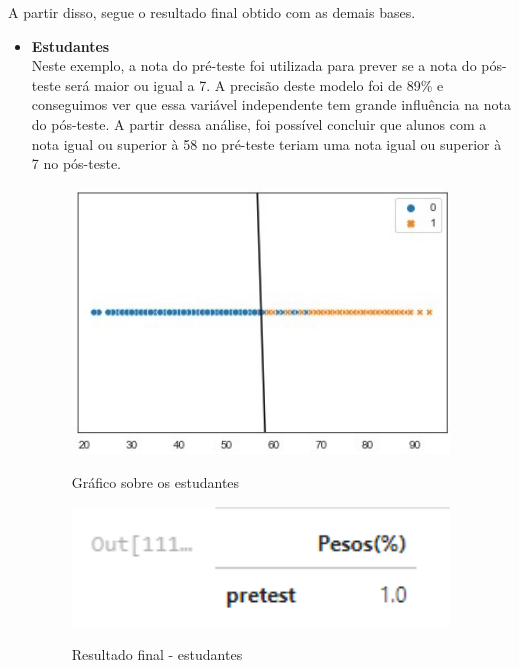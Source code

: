 \documentclass[12pt]{article}
\begin{document}
\clearpage
\hspace{0.4cm}A partir disso, segue o resultado final obtido com as demais bases. 
\\

\begin{itemize}
    \item \textbf{Estudantes}\\
    
    \hspace{0.4cm}Neste exemplo, a nota do pré-teste foi utilizada para prever se a nota do pós-teste será maior ou igual a 7. A precisão deste modelo foi de 89\% e conseguimos ver que essa variável independente tem grande influência na nota do pós-teste. A partir dessa análise, foi possível concluir que alunos com a nota igual ou superior à 58 no pré-teste teriam uma nota igual ou superior à 7 no pós-teste.
    
    
    \begin{figure}[h]
    \caption{Gráfico sobre os estudantes}
    \centering
    \includegraphics[width=10cm]{estudantes.jpg}
    \label{figura:estudantes}
    \end{figure}
    
    \begin{figure}[h]
    \caption{Resultado final - estudantes}
    \centering
    \includegraphics[width=10cm]{out4.png}
    \label{figura:out3}
    \end{figure}
    
    \vspace{50px}
    

\end{itemize}
\end{document}
